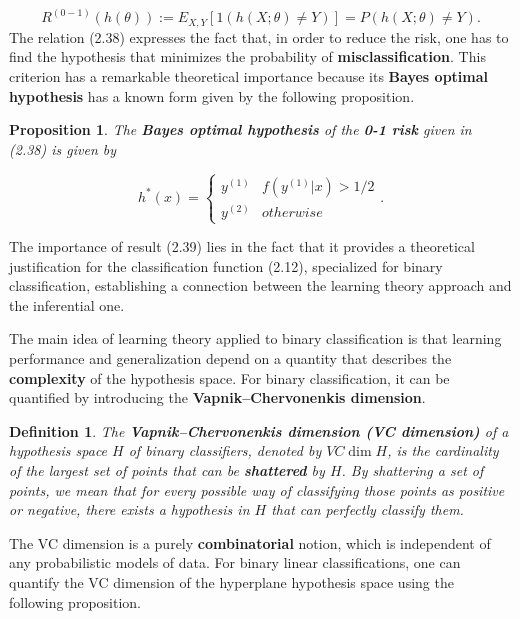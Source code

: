 \documentclass{report}
\newtheorem{definition}{Definition}[chapter]
\newtheorem{proposition}{Proposition}[chapter]
\begin{document}
\begin{equation}
R^{(0-1)}(h(\theta)) := E_{X,Y}[1(h(X;\theta) \neq Y)] = P(h(X;\theta) \neq Y).
\end{equation}
The relation (2.38) expresses the fact that, in order to reduce the risk, one has to find the hypothesis that minimizes the probability of \textbf{misclassification}. This criterion has a remarkable theoretical importance because its \textbf{Bayes optimal hypothesis} has a known form given by the following proposition.

\begin{proposition}
The \textbf{Bayes optimal hypothesis} of the \textbf{0-1 risk} given in (2.38) is given by

\begin{equation}
h^*(x) = \left\{\begin{matrix}
y^{(1)} & f(y^{(1)}|x) > 1/2\\
y^{(2)} & otherwise
\end{matrix}\right..
\end{equation}
\end{proposition}
The importance of result (2.39) lies in the fact that it provides a theoretical justification for the classification function (2.12), specialized for binary classification, establishing a connection between the learning theory approach and the inferential one.

The main idea of learning theory applied to binary classification is that learning performance and generalization depend on a quantity that describes the \textbf{complexity} of the hypothesis space.
For binary classification, it can be quantified by introducing the \textbf{Vapnik–Chervonenkis dimension}.

\begin{definition}
The \textbf{Vapnik–Chervonenkis dimension (VC dimension)} of a hypothesis space $H$ of binary classifiers, denoted by $VC\dim H$, is the cardinality of the largest set of points that can be \textbf{shattered} by $H$. By shattering a set of points, we mean that for every possible way of classifying those points as positive or negative, there exists a hypothesis in $H$ that can perfectly classify them.
\end{definition}
The VC dimension is a purely \textbf{combinatorial} notion, which is independent of any probabilistic models of data. For binary linear classifications, one can quantify the VC dimension of the hyperplane hypothesis space using the following proposition.
\end{document}
